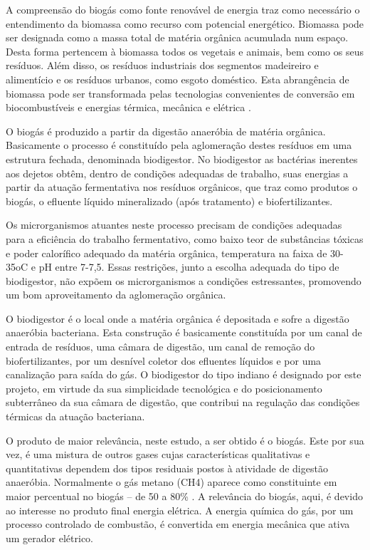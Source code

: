 A compreensão do biogás como fonte renovável de energia traz como necessário o entendimento da biomassa como recurso com potencial energético. Biomassa pode ser designada como a massa total de matéria orgânica acumulada num espaço. Desta forma pertencem à biomassa todos os vegetais e animais, bem como os seus resíduos. Além disso, os resíduos industriais dos segmentos madeireiro e alimentício e os resíduos urbanos, como esgoto doméstico. Esta abrangência de biomassa pode ser transformada pelas tecnologias convenientes de conversão em biocombustíveis e energias térmica, mecânica e elétrica \cite{staiss2001biomassa}.
\par O biogás é produzido a partir da digestão anaeróbia de matéria orgânica. Basicamente o processo é constituído pela aglomeração destes resíduos em uma estrutura fechada, denominada biodigestor. No biodigestor as bactérias inerentes aos dejetos obtêm, dentro de condições adequadas de trabalho, suas energias a partir da atuação fermentativa nos resíduos orgânicos, que traz como produtos o biogás, o efluente líquido mineralizado (após tratamento) e biofertilizantes.
\par Os microrganismos atuantes neste processo precisam de condições adequadas para a eficiência do trabalho fermentativo, como baixo teor de substâncias tóxicas e poder calorífico adequado da matéria orgânica, temperatura na faixa de 30-35oC e pH entre 7-7,5. Essas restrições, junto a escolha adequada do tipo de biodigestor, não expõem os microrganismos a condições estressantes, promovendo um bom aproveitamento da aglomeração orgânica.
\par O biodigestor é o local onde a matéria orgânica é depositada e sofre a digestão anaeróbia bacteriana. Esta construção é basicamente constituída por um canal de entrada de resíduos, uma câmara de digestão, um canal de remoção do biofertilizantes, por um desnível coletor dos efluentes líquidos e por uma canalização para saída do gás. O biodigestor do tipo indiano é designado por este projeto, em virtude da sua simplicidade tecnológica e do posicionamento subterrâneo da sua câmara de digestão, que contribui na regulação das condições térmicas da atuação bacteriana.
\par O produto de maior relevância, neste estudo, a ser obtido é o biogás. Este por sua vez, é uma mistura de outros gases cujas características qualitativas e quantitativas dependem dos tipos residuais postos à atividade de digestão anaeróbia. Normalmente o gás metano (CH4) aparece como constituinte em maior percentual no biogás – de 50 a 80\% \cite{texier1979influence}. A relevância do biogás, aqui, é devido ao interesse no produto final energia elétrica. A energia química do gás, por um processo controlado de combustão, é convertida em energia mecânica que ativa um gerador elétrico.

